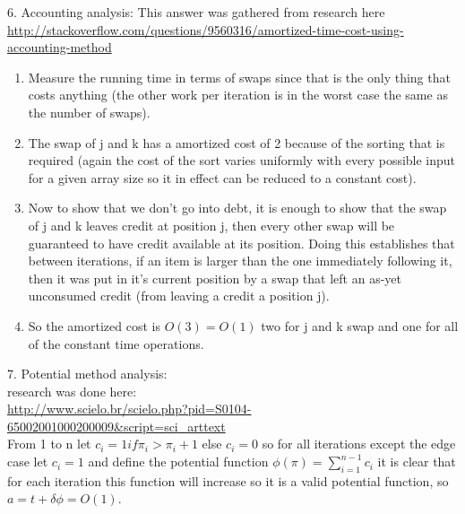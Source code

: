 \documentclass[11pt]{article}
\begin{document}
	6. Accounting analysis: This answer was gathered from research here \url{http://stackoverflow.com/questions/9560316/amortized-time-cost-using-accounting-method}
	\begin{enumerate}
		\item Measure the running time in terms of swaps since that is the only thing that costs anything (the other work per iteration is in the worst case the same as the number of swaps).
		\item The swap of j and k has a amortized cost of 2 because of the sorting that is required (again the cost of the sort varies uniformly with every possible input for a given array size so it in effect can be reduced to a constant cost).
		\item Now to show that we don't go into debt, it is enough to show that the swap of j and k leaves credit at position j, then every other swap will be guaranteed to have credit available at its position. Doing this establishes that between iterations, if an item is larger than the one immediately following it, then it was put in it's current position by a swap that left an as-yet unconsumed credit (from leaving a credit a position j).
		\item So the amortized cost is $O(3) = O(1)$ two for j and k swap and one for all of the constant time operations.
	\end{enumerate}
	7. Potential method analysis:\\ research was done here:\\ \url{http://www.scielo.br/scielo.php?pid=S0104-65002001000200009&script=sci_arttext}\\
From 1 to n let $c_i = 1 if \pi_i > \pi_i+1$ else $c_i = 0$ so for all iterations except the edge case let $c_i = 1$ and define the potential function $\phi(\pi) = \sum\limits_{i=1}^{n-1} c_i$ it is clear that for each iteration this function will increase so it is a valid potential function, so $ a = t + \delta\phi = O(1) $.
\end{document}
